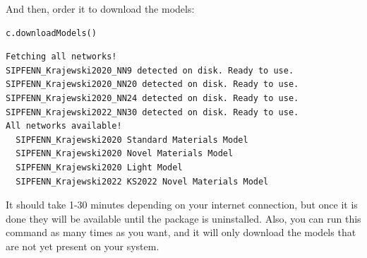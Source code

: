 And then, order it to download the models:

\begin{verbatim}
c.downloadModels()
\end{verbatim}

\begin{verbatim}
Fetching all networks!
SIPFENN_Krajewski2020_NN9 detected on disk. Ready to use.
SIPFENN_Krajewski2020_NN20 detected on disk. Ready to use.
SIPFENN_Krajewski2020_NN24 detected on disk. Ready to use.
SIPFENN_Krajewski2022_NN30 detected on disk. Ready to use.
All networks available!
  SIPFENN_Krajewski2020 Standard Materials Model
  SIPFENN_Krajewski2020 Novel Materials Model
  SIPFENN_Krajewski2020 Light Model
  SIPFENN_Krajewski2022 KS2022 Novel Materials Model
\end{verbatim}

It should take 1-30 minutes depending on your internet connection, but
once it is done they will be available until the package is uninstalled.
Also, you can run this command as many times as you want, and it will
only download the models that are not yet present on your system.
